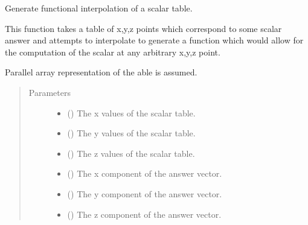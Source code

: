 \documentclass[letterpaper,10pt,english]{sphinxmanual}
\begin{document}

\begin{fulllineitems}
\label{\detokenize{Backend.table_interpolation:Backend.table_interpolation.funt_interpolate_vector_table}}
Generate functional interpolation of a scalar table.

This function takes a table of x,y,z points which correspond to some scalar
answer and attempts to interpolate to generate a function which would
allow for the computation of the scalar at any arbitrary x,y,z point.

Parallel array representation of the able is assumed.
\begin{quote}\begin{description}
\item[{Parameters}] \leavevmode\begin{itemize}
\item {} 
 () \textendash{} The x values of the scalar table.

\item {} 
 () \textendash{} The y values of the scalar table.

\item {} 
 () \textendash{} The z values of the scalar table.

\item {} 
 () \textendash{} The x component of the answer vector.

\item {} 
 () \textendash{} The y component of the answer vector.

\item {} 
 () \textendash{} The z component of the answer vector.


\end{itemize}
\end{description}
\end{quote}
\end{fulllineitems}
\end{document}
